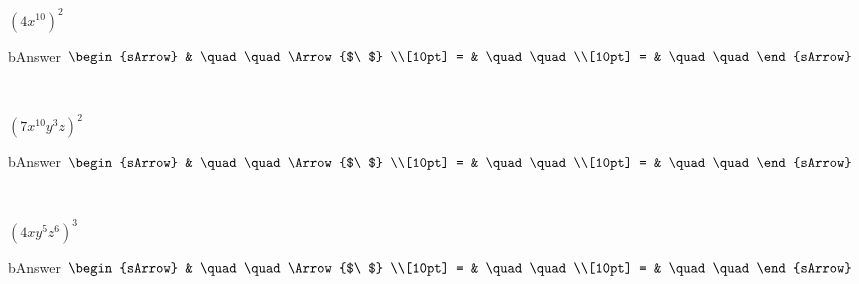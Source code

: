 \begin{enumerate}
\begin{subtask}
    \task[] $ (4x^{10})^2  $
              \begin{envOut}[equal height group=A-Rev-1]{bAnswer}
			       $\begin{sArrow}
			             & \quad\quad       \Arrow{$\ $} \\[10pt]
                       = & \quad\quad               \\[10pt]      
					   = & \quad\quad  
	                \end{sArrow}$
              \end{envOut}
			  \begin{shortsolution}  
			     $ \quad \quad \quad \quad$
			\end{shortsolution}	

    \task[] $ {(7x^{10}y^3 z)}^2  $
              \begin{envOut}[equal height group=A-Rev-1]{bAnswer}
			       $\begin{sArrow}
			             & \quad\quad       \Arrow{$\ $} \\[10pt]
                       = & \quad\quad               \\[10pt]      
					   = & \quad\quad  
	                \end{sArrow}$
              \end{envOut}
			  \begin{shortsolution}  
			     $ \quad \quad \quad \quad$
			\end{shortsolution}	


    \task[] $ {(4x y^{5}z^6)}^3  $
              \begin{envOut}[equal height group=A-Rev-1]{bAnswer}
			       $\begin{sArrow}
			             & \quad\quad       \Arrow{$\ $} \\[10pt]
                       = & \quad\quad               \\[10pt]      
					   = & \quad\quad  
	                \end{sArrow}$
              \end{envOut}
			  \begin{shortsolution}  
			     $ \quad \quad \quad \quad$
			\end{shortsolution}	

   \end{subtask}   			
\end{enumerate}

